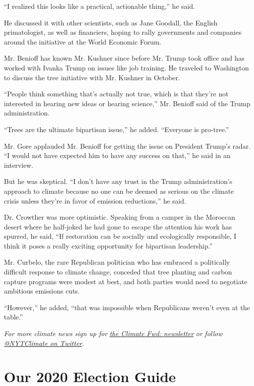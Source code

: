 ``I realized this looks like a practical, actionable thing,'' he said.

He discussed it with other scientists, such as Jane Goodall, the English
primatologist, as well as financiers, hoping to rally governments and
companies around the initiative at the World Economic Forum.

Mr. Benioff has known Mr. Kushner since before Mr. Trump took office and
has worked with Ivanka Trump on issues like job training. He traveled to
Washington to discuss the tree initiative with Mr. Kushner in October.

``People think something that's actually not true, which is that they're
not interested in hearing new ideas or hearing science,'' Mr. Benioff
said of the Trump administration.

``Trees are the ultimate bipartisan issue,'' he added. ``Everyone is
pro-tree.''

Mr. Gore applauded Mr. Benioff for getting the issue on President
Trump's radar. ``I would not have expected him to have any success on
that,'' he said in an interview.

But he was skeptical. ``I don't have any trust in the Trump
administration's approach to climate because no one can be deemed as
serious on the climate crisis unless they're in favor of emission
reductions,'' he said.

Dr. Crowther was more optimistic. Speaking from a camper in the Moroccan
desert where he half-joked he had gone to escape the attention his work
has spurred, he said, ``If restoration can be socially and ecologically
responsible, I think it poses a really exciting opportunity for
bipartisan leadership.''

Mr. Curbelo, the rare Republican politician who has embraced a
politically difficult response to climate change, conceded that tree
planting and carbon capture programs were modest at best, and both
parties would need to negotiate ambitious emissions cuts.

``However,'' he added, ``that was impossible when Republicans weren't
even at the table.''

\emph{For more climate news sign up for}
\href{https://www.nytimes3xbfgragh.onion/newsletters/climate-change}{\emph{the
Climate Fwd: newsletter}} \emph{or follow}
\href{https://twitter.com/nytclimate}{\emph{@NYTClimate on
Twitter}}\emph{.}

\hypertarget{our-2020-election-guide}{%
\section{Our 2020 Election Guide}\label{our-2020-election-guide}}


